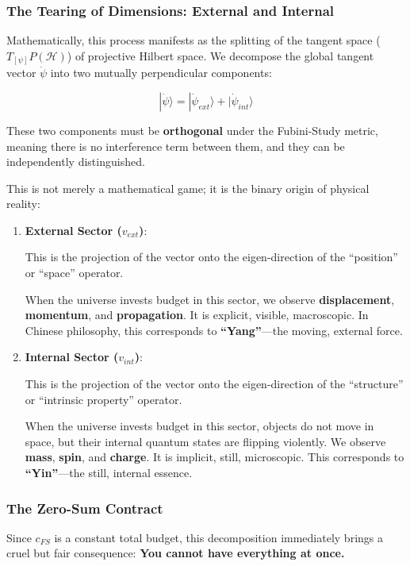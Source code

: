 \subsubsection{The Tearing of Dimensions: External and Internal}

Mathematically, this process manifests as the splitting of the tangent space ($T_{[\psi]}P(\mathcal{H})$) of projective Hilbert space. We decompose the global tangent vector $\dot{\psi}$ into two mutually perpendicular components:

\[|\dot{\psi}\rangle = |\dot{\psi}_{ext}\rangle + |\dot{\psi}_{int}\rangle\]

These two components must be \textbf{orthogonal} under the Fubini-Study metric, meaning there is no interference term between them, and they can be independently distinguished.

This is not merely a mathematical game; it is the binary origin of physical reality:

\begin{enumerate}
\item \textbf{External Sector ($v_{ext}$)}:

    This is the projection of the vector onto the eigen-direction of the ``position'' or ``space'' operator.

    When the universe invests budget in this sector, we observe \textbf{displacement}, \textbf{momentum}, and \textbf{propagation}. It is explicit, visible, macroscopic. In Chinese philosophy, this corresponds to \textbf{``Yang''}---the moving, external force.

\item \textbf{Internal Sector ($v_{int}$)}:

    This is the projection of the vector onto the eigen-direction of the ``structure'' or ``intrinsic property'' operator.

    When the universe invests budget in this sector, objects do not move in space, but their internal quantum states are flipping violently. We observe \textbf{mass}, \textbf{spin}, and \textbf{charge}. It is implicit, still, microscopic. This corresponds to \textbf{``Yin''}---the still, internal essence.
\end{enumerate}

\subsubsection{The Zero-Sum Contract}

Since $c_{FS}$ is a constant total budget, this decomposition immediately brings a cruel but fair consequence: \textbf{You cannot have everything at once.}

